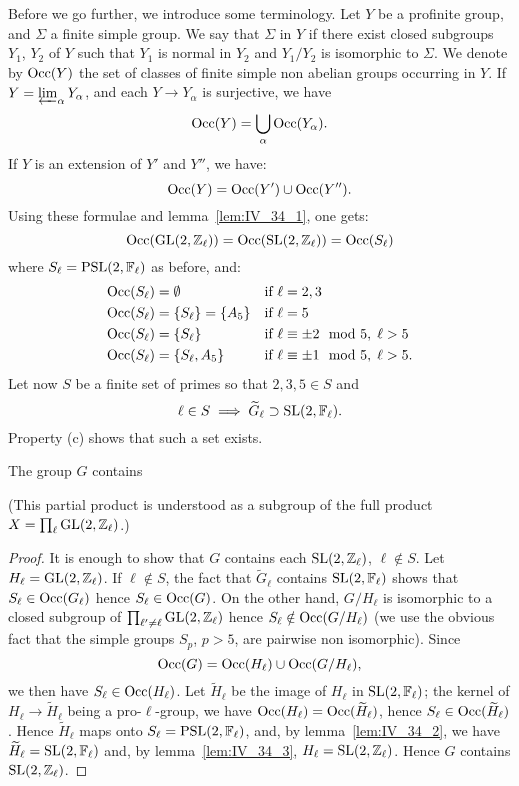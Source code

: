 Before we go further, we introduce some terminology. Let $Y$ be a profinite
group, and $\Sigma$ a finite simple group. We say that $\Sigma$ 
in $Y$ if there exist closed subgroups $Y_1$, $Y_2$ of $Y$ such that $Y_1$ is
normal in $Y_2$ and $Y_1/Y_2$ is isomorphic to $\Sigma$. We denote by
$\operatorname{Occ}(Y)$ the set of classes of finite simple non abelian groups
occurring in $Y$. If $Y = \varprojlim_\alpha Y_\alpha$, and each $Y \to Y_\alpha$
is surjective, we have
\[
	\operatorname{Occ}(Y) = \bigcup_{\alpha} \operatorname{Occ}(Y_\alpha).
\]
If $Y$ is an extension of $Y'$ and $Y''$, we have:
\[
	\operatorname{Occ}(Y) = \operatorname{Occ}(Y')\cup \operatorname{Occ}(Y'').
\]
Using these formulae and lemma~\ref{lem:IV_34_1}, one gets:
\[
	\operatorname{Occ}(\operatorname{GL}(2, \mathbb{Z}_\ell)) = \operatorname{Occ}(\operatorname{SL}(2, \mathbb{Z}_\ell)) = \operatorname{Occ}(S_\ell)
\]
where $S_\ell = \operatorname{PSL}(2, \mathbb{F}_\ell)$ as before, and:
\begin{align*}
	\operatorname{Occ}(S_\ell) &= \emptyset                && \text{if } \ell = 2,3 \\
	\operatorname{Occ}(S_\ell) &= \{ S_\ell \} = \{ A_5 \} && \text{if } \ell = 5 \\
	\operatorname{Occ}(S_\ell) &= \{ S_\ell \}             && \text{if } \ell \equiv \pm 2 \mod 5, \; \ell > 5 \\
	\operatorname{Occ}(S_\ell) &= \{ S_\ell, A_5 \}        && \text{if } \ell \equiv \pm 1 \mod 5, \; \ell > 5.
\end{align*}
Let now $S$ be a finite set of primes so that $2, 3, 5 \in S$ and
\dpage
\[
	\ell \in S \implies \widetilde{G}_\ell \supset \operatorname{SL}(2, \mathbb{F}_\ell).
\]
Property (c) shows that such a set exists.

\begin{lem}\label{lem:IV_34_5}
	The group $G$ contains 
\end{lem}
(This partial product is understood as a subgroup of the full product $X =
\prod_\ell \operatorname{GL}(2,\mathbb{Z}_\ell)$.)
\begin{proof}
	It is enough to show that $G$ contains each $\operatorname{SL}(2, \mathbb{Z}_\ell)$, $\ell
	\notin S$.  Let $H_\ell = \operatorname{GL}(2, \mathbb{Z}_\ell)$. If $\ell \notin S$, the
	fact that $\widetilde{G}_\ell$ contains $\operatorname{SL}(2, \mathbb{F}_\ell)$ shows that
	$S_\ell \in \operatorname{Occ}(G_\ell)$ hence $S_\ell \in \operatorname{Occ}(G)$. On the other
	hand, $G/H_\ell$ is isomorphic to a closed subgroup of
	$\prod_{\ell'\ne\ell} \operatorname{GL}(2, \mathbb{Z}_\ell)$ hence $S_\ell \notin
	\operatorname{Occ}(G/H_\ell)$ (we use the obvious fact that the simple groups $S_p$,
	$p > 5$, are pairwise non isomorphic). Since
	\[
		\operatorname{Occ}(G) = \operatorname{Occ}(H_\ell) \cup \operatorname{Occ}(G/H_\ell),
	\]
	we then have $S_\ell \in \operatorname{Occ}(H_\ell)$. Let $\widetilde{H}_\ell$ be the
	image of $H_\ell$ in $\operatorname{SL}(2, \mathbb{F}_\ell)$; the kernel of $H_\ell \to
	\widetilde{H}_\ell$ being a pro-$\ell$-group, we have $\operatorname{Occ}(H_\ell) =
	\operatorname{Occ}(\widetilde H_\ell)$, hence $S_\ell \in \operatorname{Occ}(\widetilde H_\ell)$.
	Hence $\widetilde H_\ell$ maps onto $S_\ell = \operatorname{PSL}(2,\mathbb{F}_\ell)$, and, by
	lemma~\ref{lem:IV_34_2}, we have $\widetilde H_\ell = \operatorname{SL}(2, \mathbb{F}_\ell)$
	and, by lemma~\ref{lem:IV_34_3}, $H_\ell = \operatorname{SL}(2, \mathbb{Z}_\ell)$. Hence $G$
	contains $\operatorname{SL}(2, \mathbb{Z}_\ell)$.
\end{proof}

